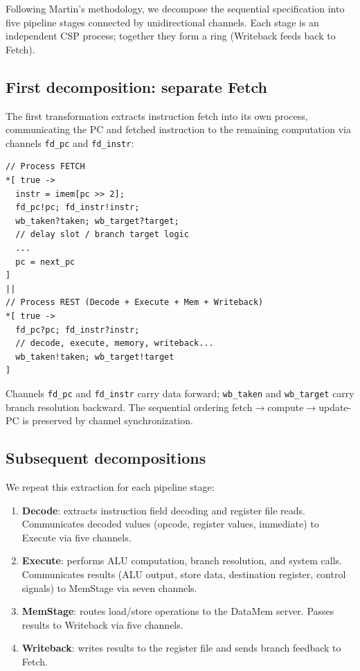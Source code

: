 \documentclass[11pt]{article}
\begin{document}
Following Martin's methodology, we decompose the sequential specification into
five pipeline stages connected by unidirectional channels.  Each stage is an
independent CSP process; together they form a ring (Writeback feeds back to
Fetch).

\subsection{First decomposition: separate Fetch}

The first transformation extracts instruction fetch into its own process,
communicating the PC and fetched instruction to the remaining computation
via channels \texttt{fd\_pc} and \texttt{fd\_instr}:

\begin{lstlisting}[style=csp,caption={Decomposition step 1: extracting Fetch}]
// Process FETCH
*[ true ->
  instr = imem[pc >> 2];
  fd_pc!pc; fd_instr!instr;
  wb_taken?taken; wb_target?target;
  // delay slot / branch target logic
  ...
  pc = next_pc
]
||
// Process REST (Decode + Execute + Mem + Writeback)
*[ true ->
  fd_pc?pc; fd_instr?instr;
  // decode, execute, memory, writeback...
  wb_taken!taken; wb_target!target
]
\end{lstlisting}

Channels \texttt{fd\_pc} and \texttt{fd\_instr} carry data forward;
\texttt{wb\_taken} and \texttt{wb\_target} carry branch resolution
backward.  The sequential ordering fetch${}\to{}$compute${}\to{}$update-PC
is preserved by channel synchronization.

\subsection{Subsequent decompositions}

We repeat this extraction for each pipeline stage:

\begin{enumerate}
\item \textbf{Decode}: extracts instruction field decoding and register file
  reads.  Communicates decoded values (opcode, register values, immediate)
  to Execute via five channels.

\item \textbf{Execute}: performs ALU computation, branch resolution, and
  system calls.  Communicates results (ALU output, store data, destination
  register, control signals) to MemStage via seven channels.

\item \textbf{MemStage}: routes load/store operations to the DataMem server.
  Passes results to Writeback via five channels.

\item \textbf{Writeback}: writes results to the register file and sends
  branch feedback to Fetch.
\end{enumerate}
\end{document}
